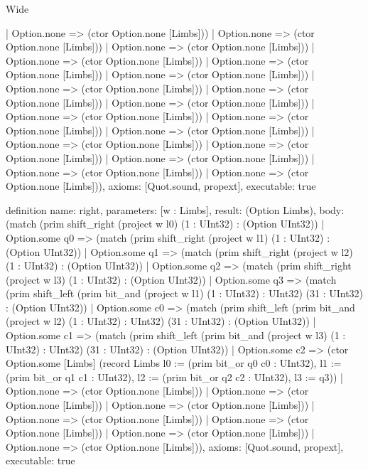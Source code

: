 \begin{lexlean}{Wide}
\begin{semanticmodule}
{                                    | Option.none => (ctor Option.none [Limbs]))
                                  | Option.none => (ctor Option.none [Limbs]))
                                | Option.none => (ctor Option.none [Limbs]))
                              | Option.none => (ctor Option.none [Limbs]))
                            | Option.none => (ctor Option.none [Limbs]))
                          | Option.none => (ctor Option.none [Limbs]))
                        | Option.none => (ctor Option.none [Limbs]))
                      | Option.none => (ctor Option.none [Limbs]))
                    | Option.none => (ctor Option.none [Limbs]))
                  | Option.none => (ctor Option.none [Limbs]))
                | Option.none => (ctor Option.none [Limbs]))
              | Option.none => (ctor Option.none [Limbs]))
            | Option.none => (ctor Option.none [Limbs]))
          | Option.none => (ctor Option.none [Limbs]))
        | Option.none => (ctor Option.none [Limbs]))
      | Option.none => (ctor Option.none [Limbs]))
    | Option.none => (ctor Option.none [Limbs])),
  axioms: [Quot.sound, propext],
  executable: true
}

definition{
  name: right,
  parameters: [w : Limbs],
  result: (Option Limbs),
  body: (match (prim shift_right (project w l0) (1 : UInt32) : (Option UInt32))
    | Option.some q0 => (match (prim shift_right (project w l1) (1 : UInt32) : (Option UInt32))
      | Option.some q1 => (match (prim shift_right (project w l2) (1 : UInt32) : (Option UInt32))
        | Option.some q2 => (match (prim shift_right (project w l3) (1 : UInt32) : (Option UInt32))
          | Option.some q3 => (match (prim shift_left (prim bit_and (project w l1) (1 : UInt32) : UInt32) (31 : UInt32) : (Option UInt32))
            | Option.some c0 => (match (prim shift_left (prim bit_and (project w l2) (1 : UInt32) : UInt32) (31 : UInt32) : (Option UInt32))
              | Option.some c1 => (match (prim shift_left (prim bit_and (project w l3) (1 : UInt32) : UInt32) (31 : UInt32) : (Option UInt32))
                | Option.some c2 => (ctor Option.some [Limbs] (record Limbs {l0 := (prim bit_or q0 c0 : UInt32), l1 := (prim bit_or q1 c1 : UInt32), l2 := (prim bit_or q2 c2 : UInt32), l3 := q3}))
                | Option.none => (ctor Option.none [Limbs]))
              | Option.none => (ctor Option.none [Limbs]))
            | Option.none => (ctor Option.none [Limbs]))
          | Option.none => (ctor Option.none [Limbs]))
        | Option.none => (ctor Option.none [Limbs]))
      | Option.none => (ctor Option.none [Limbs]))
    | Option.none => (ctor Option.none [Limbs])),
  axioms: [Quot.sound, propext],
  executable: true
}


\end{semanticmodule}
\end{lexlean}
